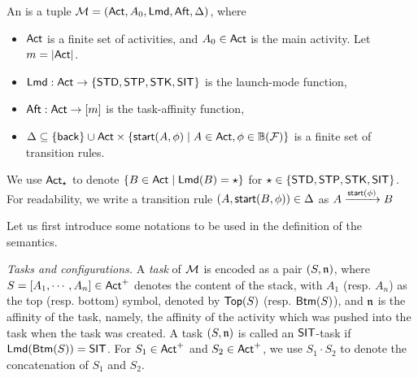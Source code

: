 \begin{definition} \label{def:afsm}
An {\AMASS} is a tuple ${\mathcal{M} } = ({\sf Act}, A_0, {\sf Lmd}, {\sf Aft}, \Delta)$, where 
\begin{itemize}
\item ${\sf Act}$ is a finite set of activities, and $A_0 \in {\sf Act}$ is the main activity. Let $m=|{\sf Act}|$.
\item ${\sf Lmd} : {\sf Act} \rightarrow \{{\sf STD},{\sf STP},{\sf STK},{\sf SIT}\}$ is the launch-mode function,
%
\item ${\sf Aft} : {\sf Act} \rightarrow [m]$ is the task-affinity function, 
%
\item $\Delta \subseteq \{{\mathsf{back} }\} \cup {\sf Act} \times \{{\mathsf{start} }(A,\phi)\mid A \in {\sf Act}, \phi \in \mathbb{B}(\mathcal{F})\}$ is a finite set of transition rules.
\end{itemize}
%
\end{definition}
We use ${\sf Act}_{\star}$ to denote $\{B\in{\sf Act}\mid {\sf Lmd}(B)= \star\}$ for $\star\in\{\mathsf{STD},\mathsf{STP},\mathsf{STK},\mathsf{SIT}\}$.
For readability, we write a transition rule $(A, {\mathsf{start} }(B, \phi))\in \Delta$ as $A \xrightarrow{{\mathsf{start} }(\phi)} B$




Let us first introduce some notations to be used in the definition of the semantics.

\emph{Tasks and configurations.} A \emph{task} of ${\mathcal{M} }$ is encoded as a pair $(S, \mathfrak{n})$, where $S= [A_1, \cdots, A_n] \in {\sf Act}^+$ denotes the content of the stack, with $A_1$ (resp. $A_n$) as  the top (resp. bottom) symbol, denoted by $\mathsf{Top}(S)$ (resp. $\mathsf{Btm}(S)$), and $\mathfrak{n}$ is the affinity of the task, namely, the affinity of the activity which was pushed into the task when the task was created. A task $(S, \mathfrak{n})$ is called an $\mathsf{SIT}$-task if ${\sf Lmd}(\mathsf{Btm}(S)) = \mathsf{SIT}$.
For $S_1 \in {\sf Act}^+$ and $S_2 \in {\sf Act}^+$, we use $S_1 \cdot S_2$ to denote the concatenation of $S_1$ and $S_2$.

